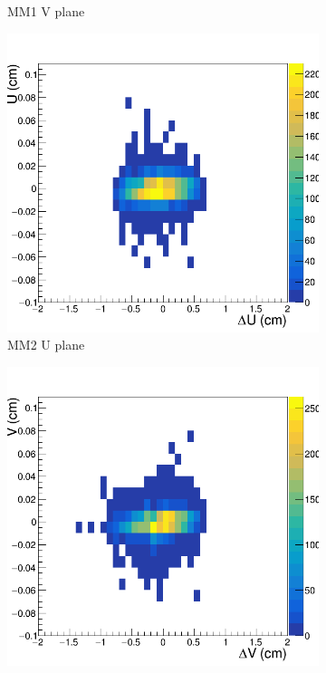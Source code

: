 \begin{figure}[h!]
\begin{subfigure}[r]{.45\textwidth}
   \caption{MM1 V plane}
 \end{subfigure}
 \hfill
 \begin{subfigure}[l]{.45\textwidth}
   \centering
   \includegraphics[width=\linewidth]{thesis_figures/alignment/Run_3211_T/rotMX2U_after_millepede_T.png}
   \caption{MM2 U plane}
 \end{subfigure}
 \begin{subfigure}[r]{.45\textwidth}
   \centering
   \includegraphics[width=\linewidth]{thesis_figures/alignment/Run_3211_T/rotMX2V_after_millepede_T.png}

\end{subfigure}
\end{figure}
